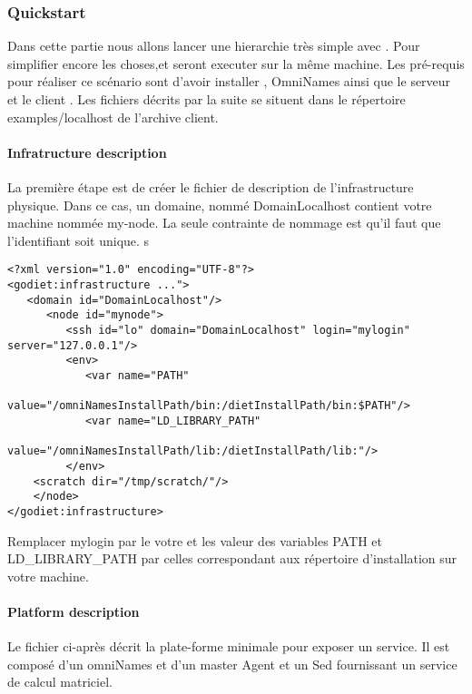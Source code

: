 \subsubsection{Quickstart}

Dans cette partie nous allons lancer une hierarchie \diet très simple avec \godiet. Pour simplifier encore les choses,\diet et \godiet seront executer sur la même machine. Les pré-requis pour réaliser ce scénario sont d'avoir installer \diet, OmniNames ainsi que le serveur et le client \godiet.
Les fichiers décrits par la suite se situent dans le répertoire examples/localhost de l'archive \godiet client.

\paragraph{Infratructure description}
La première étape est de créer le fichier de description de l'infrastructure physique. Dans ce cas, un domaine,  nommé DomainLocalhost contient votre machine nommée my-node. 
La seule contrainte de nommage est qu'il faut que l'identifiant soit unique.
s
\begin{verbatim}
<?xml version="1.0" encoding="UTF-8"?>
<godiet:infrastructure ...">
   <domain id="DomainLocalhost"/>
      <node id="mynode">
         <ssh id="lo" domain="DomainLocalhost" login="mylogin" server="127.0.0.1"/>
         <env>
            <var name="PATH"
                  value="/omniNamesInstallPath/bin:/dietInstallPath/bin:$PATH"/>
            <var name="LD_LIBRARY_PATH"
                  value="/omniNamesInstallPath/lib:/dietInstallPath/lib:"/>
         </env>
	<scratch dir="/tmp/scratch/"/>	
	</node>
</godiet:infrastructure>
\end{verbatim}

Remplacer mylogin par le votre et les valeur des variables PATH et LD\_LIBRARY\_PATH par celles correspondant aux répertoire d'installation sur votre machine.


\paragraph{Platform description}

Le fichier ci-après décrit la plate-forme minimale pour exposer un service. Il est composé d'un omniNames et d'un master Agent et un Sed fournissant un service de calcul matriciel. 

